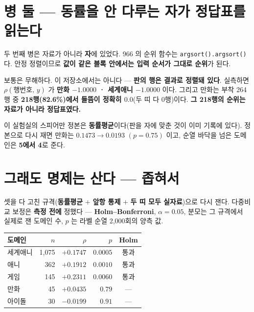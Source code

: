 \documentclass[10pt]{article}
\begin{document}
\section{병 둘 --- 동률을 안 다루는 자가 정답표를 읽는다}

두 번째 병은 자료가 아니라 \textbf{자}에 있었다. 966 의 순위 함수는
\texttt{argsort().argsort()} 다. 안정 정렬이므로 \textbf{값이 같은 블록 안에서는
입력 순서가 그대로 순위}가 된다.

보통은 무해하다. 이 저장소에서는 아니다 --- \textbf{판의 행은 결과로 정렬돼
있다}. 실측하면 $\rho(\text{행번호},\,y)$ 가 \textbf{만화 $-1.0000$ · 세계애니
$-1.0000$} 이다. 그리고 만화는 부착 264행 중 \textbf{218행(82.6\%)에서 들뜸이 정확히
$0.0$}(두 띠 다 0행)이다. \textbf{그 218행의 순위는 자료가 아니라 정답표였다.}

이 실험실의 스피어만 정본은 \textbf{동률평균}이다(판을 자에 맞춘 것이 이미 기록에
있다). 정본으로 다시 재면 만화는 $0.1473 \to \mathbf{0.0193}$ $(p=0.75)$ 이고,
순열 바닥을 넘은 도메인은 \textbf{5에서 4}로 준다.


\section{그래도 명제는 산다 --- 좁혀서}

셋을 다 고친 규격(\textbf{동률평균} $+$ \textbf{앞항 통제} $+$ \textbf{두 띠 모두
실자료})으로 다시 잰다. 다중비교 보정은 \textbf{측정 전에} 정했다 ---
\textbf{Holm--Bonferroni}, $\alpha=0.05$, 분모는 그 규격에서 실제로 잰 도메인 수,
$p$ 는 라벨 순열 2{,}000회의 양측 값.

\begin{center}\small
\begin{tabular}{lrrrc}
\hline
도메인 & $n$ & $\rho$ & $p$ & Holm\\
\hline
세계애니 & 1{,}075 & $+0.1747$ & $0.0005$ & 통과\\
애니     & 362     & $+0.1912$ & $0.0010$ & 통과\\
게임     & 145     & $+0.2311$ & $0.0060$ & 통과\\
만화     & 45      & $+0.0435$ & $0.79$   & ---\\
아이돌   & 30      & $-0.0199$ & $0.91$   & ---\\
\hline
\end{tabular}
\end{center}
\end{document}
